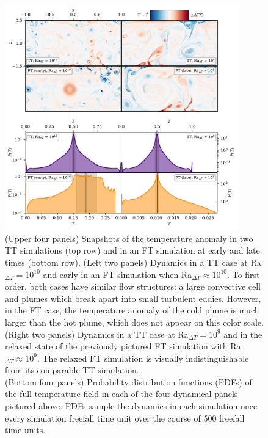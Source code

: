\begin{figure}[p!]
\begin{center}
\includegraphics[width=0.9\textwidth]{./figs/rbc_evolution_dynamics.pdf}
\end{center}
\vspace{-0.75cm}
\caption[Snapshots and PDFs comparing temperature fields in FT and TT simulations.]{ 
	(Upper four panels) Snapshots of the temperature anomaly in two TT simulations (top row) and in an FT simulation at early and late times (bottom row).
	(Left two panels) Dynamics in a TT case at Ra$_{\Delta T} = 10^{10}$ and early in an FT simulation when Ra$_{\Delta T} \approx 10^{10}$.
	To first order, both cases have similar flow structures: a large convective cell and plumes which break apart into small turbulent eddies.
	However, in the FT case, the temperature anomaly of the cold plume is much larger than the hot plume, which does not appear on this color scale.
	(Right two panels) Dynamics in a TT case at Ra$_{\Delta T} = 10^9$ and in the relaxed state of the previously pictured FT simulation with Ra$_{\Delta T} \approx 10^9$.
	The relaxed FT simulation is visually indistinguishable from its comparable TT simulation.
\\	
	(Bottom four panels) Probability distribution functions (PDFs) of the full temperature field in each of the four dynamical panels pictured above.
	PDFs sample the dynamics in each simulation once every simulation freefall time unit over the course of 500 freefall time units.
}
\end{figure}
